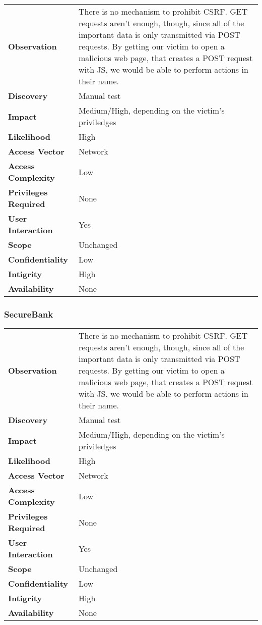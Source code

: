 \begin{tabular}{l|p{10cm}}
\textbf{Observation} & There is no mechanism to prohibit CSRF. GET requests aren't enough, though, since all of the important data is only transmitted via POST requests. By getting our victim to open a malicious web page, that creates a POST request with JS, we would be able to perform actions in their name. \\
\textbf{Discovery} & Manual test \\
\textbf{Impact} & Medium/High, depending on the victim's priviledges \\
\textbf{Likelihood} & High \\
\textbf{Access Vector} & Network \\
\textbf{Access Complexity} & Low\\
\textbf{Privileges Required} & None \\
\textbf{User Interaction} & Yes \\
\textbf{Scope} & Unchanged \\
\textbf{Confidentiality} & Low \\
\textbf{Intigrity} & High\\
\textbf{Availability} & None \\
\end{tabular}

\subsubsection*{SecureBank}

\begin{tabular}{l|p{10cm}}
\textbf{Observation} & There is no mechanism to prohibit CSRF. GET requests aren't enough, though, since all of the important data is only transmitted via POST requests. By getting our victim to open a malicious web page, that creates a POST request with JS, we would be able to perform actions in their name. \\
\textbf{Discovery} & Manual test \\
\textbf{Impact} & Medium/High, depending on the victim's priviledges \\
\textbf{Likelihood} & High \\
\textbf{Access Vector} & Network \\
\textbf{Access Complexity} & Low\\
\textbf{Privileges Required} & None \\
\textbf{User Interaction} & Yes \\
\textbf{Scope} & Unchanged \\
\textbf{Confidentiality} & Low \\
\textbf{Intigrity} & High\\
\textbf{Availability} & None \\
\end{tabular}


